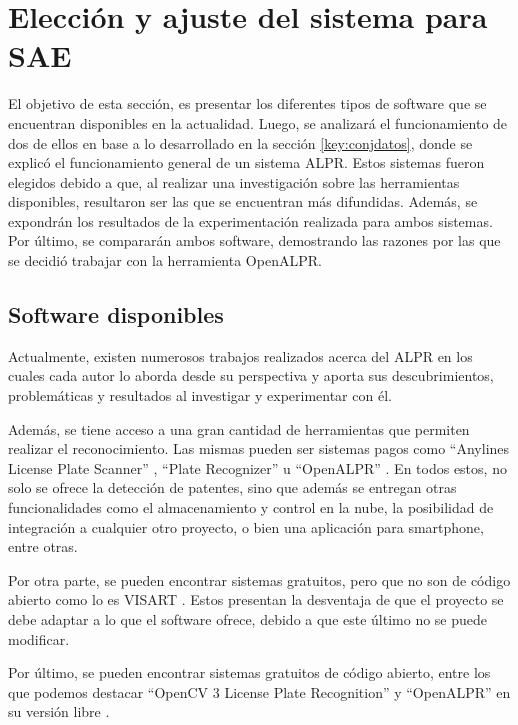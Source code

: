 \section{Elección y ajuste del sistema para SAE}

El objetivo de esta sección, es presentar los diferentes tipos de software que se encuentran disponibles en la actualidad. Luego, se analizará el funcionamiento de dos de ellos en base a lo desarrollado en la sección \ref{key:conjdatos}, donde se explicó el funcionamiento general de un sistema ALPR. Estos sistemas fueron elegidos debido a que, al realizar una investigación sobre las herramientas disponibles, resultaron ser las que se encuentran más difundidas. Además, se expondrán los resultados de la experimentación realizada para ambos sistemas. Por último, se compararán ambos software, demostrando las razones por las que se decidió trabajar con la herramienta OpenALPR.

\subsection{Software disponibles} \label{key:implement}

Actualmente, existen numerosos trabajos realizados acerca del ALPR en los cuales cada autor lo aborda desde su perspectiva y aporta sus descubrimientos, problemáticas y resultados al investigar y experimentar con él.

Además, se tiene acceso a una gran cantidad de herramientas que permiten realizar el reconocimiento. Las mismas pueden ser sistemas pagos como “Anylines License Plate Scanner” \cite{anyline}, “Plate Recognizer” \cite{plate-recognizer} u “OpenALPR” \cite{openalpr}. En todos estos, no solo se ofrece la detección de patentes, sino que además se entregan otras funcionalidades como el almacenamiento y control en la nube, la posibilidad de integración a cualquier otro proyecto,  o bien una aplicación para smartphone, entre otras. 

Por otra parte, se pueden encontrar sistemas gratuitos, pero que no son de código abierto como lo es VISART \cite{visart}. Estos presentan la desventaja de que el proyecto se debe adaptar a lo que el software ofrece, debido a que este último no se puede modificar.

Por último, se pueden encontrar sistemas gratuitos de código abierto, entre los que podemos destacar “OpenCV 3 License Plate Recognition” \cite{opencv3}  y “OpenALPR” en su versión libre \cite{openalprfree}.

